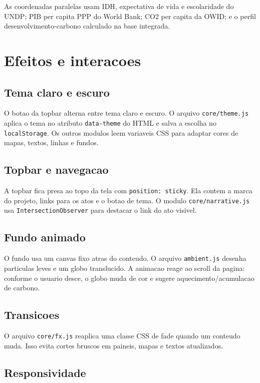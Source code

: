 \documentclass[12pt,a4paper]{article}
\begin{document}
As coordenadas paralelas usam IDH, expectativa de vida e escolaridade do UNDP; PIB per capita PPP do World Bank; CO2 per capita da OWID; e o perfil desenvolvimento-carbono calculado na base integrada.

\section{Efeitos e interacoes}

\subsection{Tema claro e escuro}

O botao da topbar alterna entre tema claro e escuro. O arquivo \texttt{core/theme.js} aplica o tema no atributo \texttt{data-theme} do HTML e salva a escolha no \texttt{localStorage}. Os outros modulos leem variaveis CSS para adaptar cores de mapas, textos, linhas e fundos.

\subsection{Topbar e navegacao}

A topbar fica presa ao topo da tela com \texttt{position: sticky}. Ela contem a marca do projeto, links para os atos e o botao de tema. O modulo \texttt{core/narrative.js} usa \texttt{IntersectionObserver} para destacar o link do ato visivel.

\subsection{Fundo animado}

O fundo usa um canvas fixo atras do conteudo. O arquivo \texttt{ambient.js} desenha particulas leves e um globo translucido. A animacao reage ao scroll da pagina: conforme o usuario desce, o globo muda de cor e sugere aquecimento/acumulacao de carbono.

\subsection{Transicoes}

O arquivo \texttt{core/fx.js} reaplica uma classe CSS de fade quando um conteudo muda. Isso evita cortes bruscos em paineis, mapas e textos atualizados.

\subsection{Responsividade}
\end{document}
